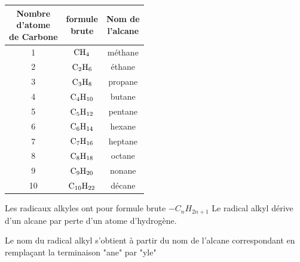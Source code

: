 \documentclass[12pt]{article}
\begin{document}
 \begin{center}
    \begin{tabular}{ |c|c|c| } 
\hline
      \makecell{Nombre \\d'atome \\de Carbone} & \makecell{formule\\ brute} & \makecell{Nom de\\ l'alcane}\\\hline
      1 &$\ce{CH_4}$    & méthane\\\hline
      
      2 &$\ce{C_2H_6}$  & éthane\\\hline
      
      3 &$\ce{C_3H_8}$    &propane  \\\hline
      4 &$\ce{C_4H_{10}}$ &butane \\\hline
      
      5 &$\ce{C_5H_{12}}$ &pentane \\\hline
      
      6 &$\ce{C_6H_{14}}$ &hexane\\\hline
      7 &$\ce{C_7H_{16}}$ &heptane\\\hline
      8 &$\ce{C_8H_{18}}$ &octane\\\hline
      9 &$\ce{C_9H_{20}}$ &nonane\\\hline
      10 &$\ce{C_10H_{22}}$ &décane\\\hline
      \hline
\end{tabular}
  \end{center}
 
  \begin{tcolorbox}
  Les radicaux alkyles ont pour formule brute $-C_n H_{2n+1}$
Le radical alkyl dérive d'un alcane par perte d'un atome d'hydrogène.

Le nom du radical alkyl s'obtient à partir du nom de l'alcane correspondant en remplaçant la terminaison "ane" par
"yle"
\end{tcolorbox}
\end{document}
